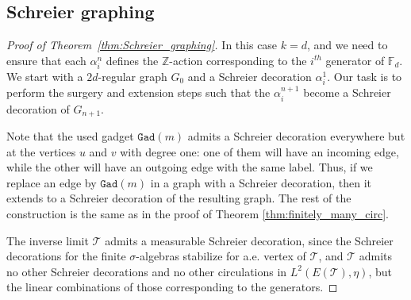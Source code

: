 \documentclass[10pt]{article}
\theoremstyle{plain}
\theoremstyle{remark}
\newcommand{\1}{\mathbbm{1}}
\newcommand{\mcT}{\mathcal{T}}
\numberwithin{equation}{section}
\begin{document}
\subsection{Schreier graphing}
\label{subsec:Shreier_graphing}
\begin{proof}[Proof of Theorem~\ref{thm:Schreier_graphing}]
    In this case $k=d$, and we need to ensure that each $\alpha^n_i$ defines the $\mathbb{Z}$-action corresponding to the $i^{th}$ generator of $\mathbb{F}_d$. We start with a $2d$-regular graph $G_0$ and a Schreier decoration $\alpha^1_i$. Our task is to perform the surgery and extension steps such that the $\alpha^{n+1}_i$ become a Schreier decoration of $G_{n+1}$.

    Note that the used gadget $\texttt{Gad}(m)$ admits a Schreier decoration everywhere but at the vertices $u$ and $v$ with degree one: one of them will have an incoming edge, while the other will have an outgoing edge with the same label. Thus, if we replace an edge by $\texttt{Gad}(m)$ in a graph with a Schreier decoration, then it extends to a Schreier decoration of the resulting graph. The rest of the construction is the same as in the proof of Theorem \ref{thm:finitely_many_circ}.
    
    The inverse limit $\mcT$ admits a measurable Schreier decoration, since the Schreier decorations for the finite $\sigma$-algebras stabilize for a.e. vertex of $\mcT$, and $\mcT$ admits no other Schreier decorations and no other circulations in $L^2(E(\mcT),\eta)$, but the linear combinations of those corresponding to the generators.
    \end{proof}
\end{document}
